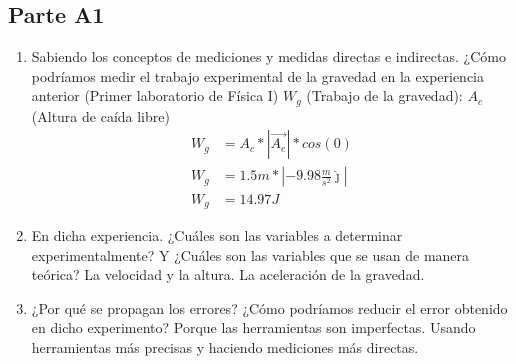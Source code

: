 \subsection{Parte A1}%
\label{sub:cues_parte_a1}

\begin{enumerate}
	\item Sabiendo los conceptos de mediciones y medidas directas e indirectas.
		¿Cómo podríamos medir el trabajo experimental de la gravedad en la experiencia anterior
		(Primer laboratorio de Física I)\newline
		$W_g$ (Trabajo de la gravedad):\newline
		$A_c$ (Altura de caída libre)
		\begin{align*}
			W_g &= A_c * |\vec{A_e}| * cos(0)\\
			W_g &= 1.5m*|-9.98 \frac{m}{s^2} \widehat{\jmath}| \\
			W_g &= 14.97 J
		\end{align*}
	\item En dicha experiencia. ¿Cuáles son las variables a determinar experimentalmente?
		Y ¿Cuáles son las variables que se usan de manera teórica?
		\subitem La velocidad y la altura.
		\subitem La aceleración de la gravedad.
	\item ¿Por qué se propagan los errores?
		¿Cómo podríamos reducir el error obtenido en dicho experimento?
		\subitem Porque las herramientas son imperfectas.
		\subitem Usando herramientas más precisas y haciendo mediciones más directas.
\end{enumerate}
